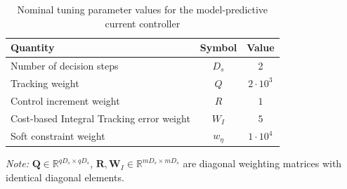 \begin{table}[H]
	\centering
	\caption{Nominal tuning parameter values for the model-predictive current controller}
	\begin{tabular}{l|c|c}
		\textbf{Quantity} & \textbf{Symbol} & \textbf{Value} \\
		\hline
		Number of decision steps & $D_s$ & 2 \\
		Tracking weight & $Q$ & $2\cdot 10^3$ \\
		Control increment weight & $R$ & $1$ \\
		Cost-based Integral Tracking error weight & $W_I$ & $5$ \\
		Soft constraint weight & $w_\eta$ & $1\cdot 10^4$ \\
	\end{tabular}
	\label{tab:typ_params_mpcc}
\end{table}
 
 \textit{Note:} $\bm{Q} \in \mathbb{R}^{qD_s \times qD_s}$,
 $\bm{R},\bm{W}_I \in \mathbb{R}^{mD_s \times mD_s}$ are diagonal
 weighting matrices with identical diagonal elements.


